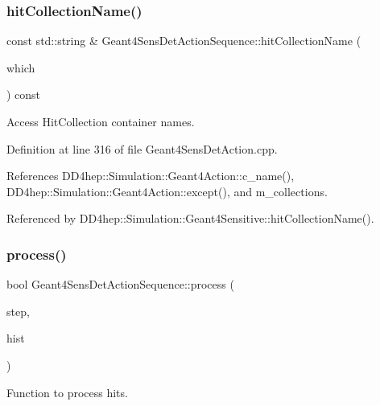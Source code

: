 \subsubsection{\texorpdfstring{hit\+Collection\+Name()}{hitCollectionName()}}
{\footnotesize\ttfamily const std\+::string \& Geant4\+Sens\+Det\+Action\+Sequence\+::hit\+Collection\+Name (\begin{DoxyParamCaption}\item[{size\+\_\+t}]{which }\end{DoxyParamCaption}) const}



Access Hit\+Collection container names. 



Definition at line 316 of file Geant4\+Sens\+Det\+Action.\+cpp.



References D\+D4hep\+::\+Simulation\+::\+Geant4\+Action\+::c\+\_\+name(), D\+D4hep\+::\+Simulation\+::\+Geant4\+Action\+::except(), and m\+\_\+collections.



Referenced by D\+D4hep\+::\+Simulation\+::\+Geant4\+Sensitive\+::hit\+Collection\+Name().

\hypertarget{class_d_d4hep_1_1_simulation_1_1_geant4_sens_det_action_sequence_a452bc5bf7c03c8b546d3459ba7bf7e36}{}\label{class_d_d4hep_1_1_simulation_1_1_geant4_sens_det_action_sequence_a452bc5bf7c03c8b546d3459ba7bf7e36} 
\subsubsection{\texorpdfstring{process()}{process()}}
{\footnotesize\ttfamily bool Geant4\+Sens\+Det\+Action\+Sequence\+::process (\begin{DoxyParamCaption}\item[{G4\+Step $\ast$}]{step,  }\item[{G4\+Touchable\+History $\ast$}]{hist }\end{DoxyParamCaption})\hspace{0.3cm}{\ttfamily [virtual]}}



Function to process hits. 



